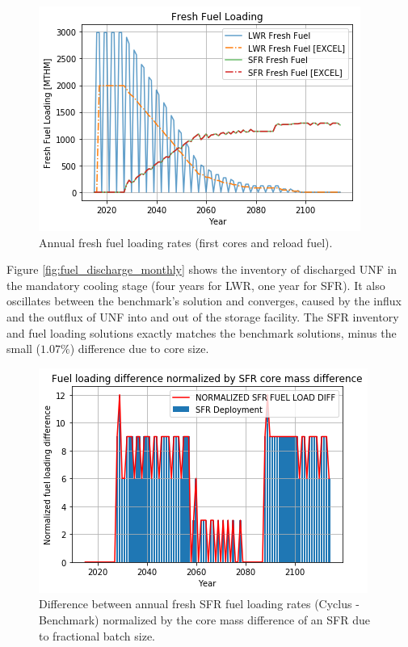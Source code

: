 \begin{figure}[htbp!]
    \begin{center}
        \includegraphics[scale=0.5]{./images/results_18/fuel_load.png}
    \end{center}
        \caption{Annual fresh fuel loading rates (first cores and reload fuel).}
    \label{fig:fuel_load}
\end{figure}

Figure \ref{fig:fuel_discharge_monthly} shows the inventory of discharged
\gls{UNF} in the mandatory cooling stage (four years for \gls{LWR}, one year for \gls{SFR}).
It also oscillates between the benchmark's
solution and converges, caused by the influx and the outflux of \gls{UNF}
into and out of the storage facility.
The \gls{SFR} inventory and fuel loading
solutions exactly matches the benchmark solutions, minus the small ($1.07\%$) difference due to core
size.

\begin{figure}[htbp!]
    \begin{center}
        \includegraphics[scale=0.5]{./images/results_18/fuel_load_diff_norm.png}
    \end{center}
        \caption{Difference between annual fresh \gls{SFR} fuel loading rates (Cyclus - Benchmark) normalized by the core mass difference of an \gls{SFR} due to fractional batch size.}
    \label{fig:fuel_load_diff_norm}
\end{figure}


